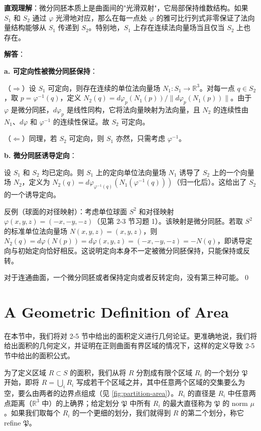 \begin{solution}
\textbf{直观理解}：微分同胚本质上是曲面间的"光滑双射"，它局部保持维数结构。如果 $S_1$ 和 $S_2$ 通过 $\varphi$ 光滑地对应，那么在每一点处 $\varphi$ 的雅可比行列式非零保证了法向量结构能够从 $S_1$ 传递到 $S_2$。特别地，$S_1$ 上存在连续法向量场当且仅当 $S_2$ 上也存在。

\textbf{解答}：

\textbf{a. 可定向性被微分同胚保持}：

（$\Rightarrow$）设 $S_1$ 可定向，则存在连续的单位法向量场 $N_1: S_1 \to \mathbb{R}^3$。对每一点 $q \in S_2$，取 $p = \varphi^{-1}(q)$，定义 $N_2(q) = d\varphi_p(N_1(p)) / \|d\varphi_p(N_1(p))\|$。由于 $\varphi$ 是微分同胚，$d\varphi_p$ 是线性同构，它将法向量映射为法向量，且 $N_2$ 的连续性由 $N_1$、$d\varphi$ 和 $\varphi^{-1}$ 的连续性保证。故 $S_2$ 可定向。

（$\Leftarrow$）同理，若 $S_2$ 可定向，则 $S_1$ 亦然，只需考虑 $\varphi^{-1}$。

\textbf{b. 微分同胚诱导定向}：

设 $S_1$ 和 $S_2$ 均已定向。则 $S_1$ 上的定向单位法向量场 $N_1$ 诱导了 $S_2$ 上的一个向量场 $N_2$，定义为 $N_2(q) = d\varphi_{\varphi^{-1}(q)}(N_1(\varphi^{-1}(q)))$（归一化后）。这给出了 $S_2$ 的一个诱导定向。

反例（球面的对径映射）：考虑单位球面 $S^2$ 和对径映射 $\varphi(x, y, z) = (-x, -y, -z)$（见第 2-3 节习题 1）。该映射是微分同胚。若取 $S^2$ 的标准单位法向量场 $N(x,y,z) = (x,y,z)$，则 $N_2(q) = d\varphi(N(p)) = d\varphi(x,y,z) = (-x,-y,-z) = -N(q)$，即诱导定向与初始定向恰好相反。这说明定向本身不一定被微分同胚保持，只能保持或反转。

对于连通曲面，一个微分同胚或者保持定向或者反转定向，没有第三种可能。\qed
\end{solution}

\section{A Geometric Definition of Area}\label{sec:geometric-area}

在本节中，我们将对 2-5 节中给出的面积定义进行几何论证。更准确地说，我们将给出面积的几何定义，并证明在正则曲面有界区域的情况下，这样的定义导致 2-5 节中给出的面积公式。

为了定义区域 $R \subset S$ 的面积，我们从将 $R$ 分割成有限个区域 $R_i$ 的一个划分 $\mathfrak{P}$ 开始，即将 $R = \bigcup_i R_i$ 写成若干个区域之并，其中任意两个区域的交集要么为空，要么由两者的边界点组成（见 \cref{fig:partition-area}）。$R_i$ 的直径是 $R_i$ 中任意两点距离（$\mathbb{R}^3$ 中）的上确界；给定划分 $\mathfrak{P}$ 中所有 $R_i$ 的最大直径称为 $\mathfrak{P}$ 的 norm $\mu$。如果我们取每个 $R_i$ 的一个更细的划分，我们就得到 $R$ 的第二个划分，称它 refine $\mathfrak{P}$。

